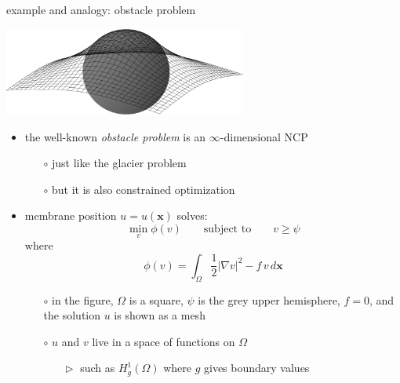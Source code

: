 \documentclass[10pt,hyperref,dvipsnames]{beamer}
\newcommand{\bx}{\mathbf{x}}
\newcommand{\grad}{\nabla}
\begin{document}
\begin{frame}{example and analogy: obstacle problem}

\begin{center}
\includegraphics[width=0.6\textwidth]{figs/obstacle65.pdf}
\end{center}

\begin{itemize}
\item the well-known \emph{obstacle problem} is an $\infty$-dimensional NCP
    \begin{itemize}
    \item[$\circ$] just like the glacier problem
    \item[$\circ$] but it is also constrained optimization
    \end{itemize}
\item membrane position $u=u(\bx)$ solves:
    $$\min_{v} \phi(v) \qquad \text{subject to} \qquad v \ge \psi$$
where
    $$\phi(v) = \int_\Omega \frac{1}{2} |\grad v|^2 - f\, v\,d\bx$$

    \begin{itemize}
    \item[$\circ$] in the figure, $\Omega$ is a square, $\psi$ is the grey upper hemisphere, $f=0$, and the solution $u$ is shown as a mesh
    \item[$\circ$] $u$ and $v$ live in a space of functions on $\Omega$
        \begin{itemize}
        \item[$\vartriangleright$] such as $H_g^1(\Omega)$ where $g$ gives boundary values
        \end{itemize}                
    \end{itemize}
\end{itemize}
\end{frame}
\end{document}

